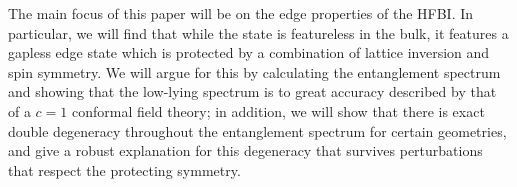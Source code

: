 
The main focus of this paper will be on the edge properties of the HFBI.
In particular, we will find that while the state is featureless in the bulk, it
features a gapless edge state which is protected by a combination of lattice 
inversion
and spin symmetry. We will argue for this by calculating the entanglement 
spectrum and showing
that the low-lying spectrum is to great accuracy described by that of a $c=1$
conformal field theory; in addition, we will show that there is exact double 
degeneracy throughout the entanglement spectrum for certain geometries, and 
give a robust explanation for this degeneracy that survives perturbations that 
respect the protecting symmetry.


